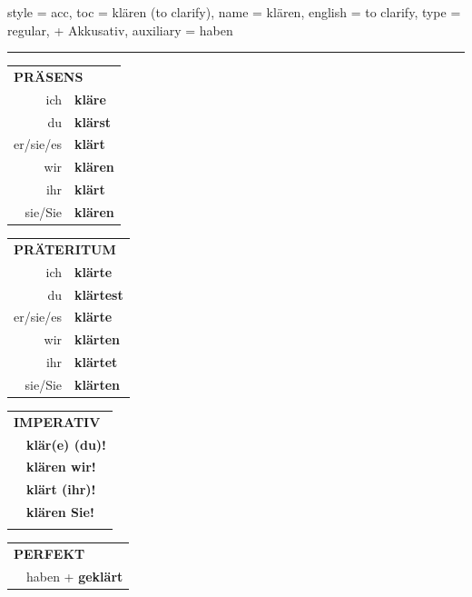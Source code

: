 \begin{verbentry}{
  style = {acc},
  toc = {klären (to clarify)},
  name = {klären},
  english = {to clarify},
  type = {regular, + Akkusativ},
  auxiliary = {haben}
}
 
    
     \vspace{5pt}

    \hrule
    
    \vspace{5pt}

  \begin{tabular}{rl}
     \multicolumn{2}{l}{\textbf{PRÄSENS} }\\
    ich & \textbf{kläre}\\
    du & \textbf{klärst}\\
    er/sie/es & \textbf{klärt}\\
    wir & \textbf{klären}\\
    ihr & \textbf{klärt}\\
    sie/Sie & \textbf{klären}\\
  \end{tabular}
  \hfill
     \begin{tabular}{rl}
    \multicolumn{2}{l}{\textbf{PRÄTERITUM} }\\
    ich & \textbf{klärte}\\
    du & \textbf{klärtest}\\
    er/sie/es & \textbf{klärte}\\
    wir & \textbf{klärten}\\
    ihr & \textbf{klärtet}\\
    sie/Sie & \textbf{klärten}\\
  \end{tabular}
  \hfill
  \begin{tabular}{rl}
     \multicolumn{2}{l}{\textbf{IMPERATIV} }\\
   & \textbf{klär(e) (du)!}\\
   & \textbf{klären wir!}\\
   & \textbf{klärt (ihr)!}\\
   & \textbf{klären Sie!}\\
   & \vspace{10pt}
  \end{tabular}

    \vspace{10pt}

 \begin{tabular}{rl}
     \multicolumn{2}{l}{\textbf{PERFEKT}}\\
   & haben + \textbf{geklärt}\\
  \end{tabular}
\hfill
   \begin{tabular}{rl}
   

\end{tabular}
\end{verbentry}
